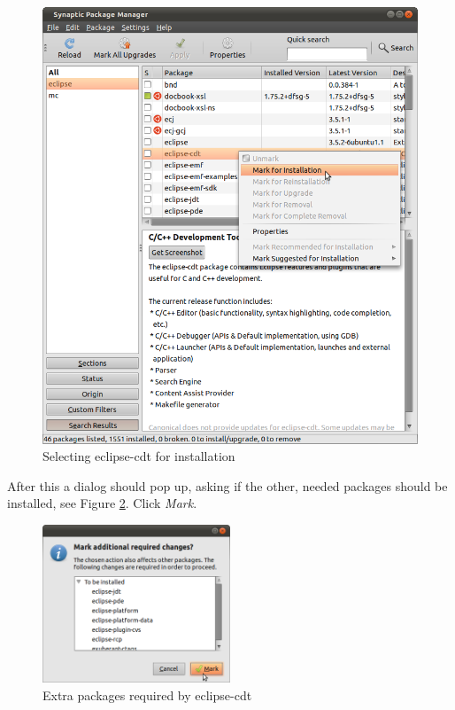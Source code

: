 \documentclass[a4paper, 10pt]{article}
\begin{document}
    \begin{figure}[H]
    \centering
        \includegraphics[width=\textwidth]{./install-guide-linux-images/synaptic-eclipse.png}
        \caption{Selecting eclipse-cdt for installation}
        \label{fig:synaptic-eclipse}
    \end{figure}

After this a dialog should pop up, asking if the other, needed packages should be installed,
see Figure \ref{fig:synaptic-eclipse-extra-packages.png}. Click \emph{Mark}.

    \begin{figure}[H]
    \centering
        \includegraphics[width=0.5\textwidth]{./install-guide-linux-images/synaptic-eclipse-extra-packages.png}
        \caption{Extra packages required by eclipse-cdt}
        \label{fig:synaptic-eclipse-extra-packages.png}
    \end{figure}
\end{document}
